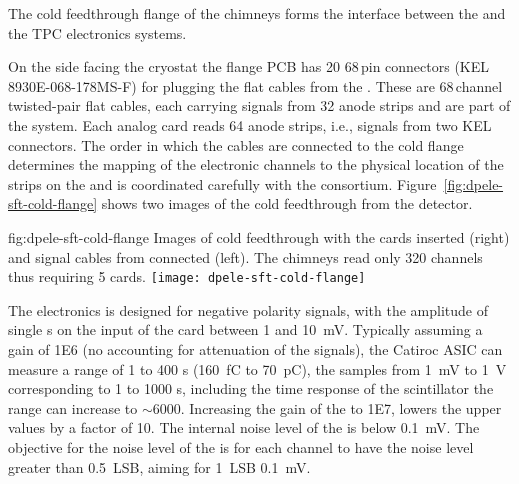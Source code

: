 The cold feedthrough flange of the  chimneys forms the interface between the  and the TPC electronics systems. 

On the side facing the cryostat the flange PCB has \num{20} \num{68}\,pin connectors (KEL 8930E-068-178MS-F) for plugging the flat cables from the . These are \num{68}\,channel twisted-pair flat cables, each carrying signals from \num{32} anode strips and are part of the  system. Each analog  card reads \num{64} anode strips, i.e., %
signals from two KEL connectors. The order in which the cables are connected %
to the cold flange determines the mapping of the electronic channels to the physical location of the strips on the  and is %
coordinated carefully with the  consortium. %
Figure~\ref{fig:dpele-sft-cold-flange} shows two images of the cold feedthrough from the  detector.

\begin{dunefigure}{fig:dpele-sft-cold-flange}
{Images of   cold feedthrough with the  cards inserted (right) and signal cables from  connected (left). The   chimneys read only \num{320} channels thus requiring \num{5}  cards.}
\texttt{[image: dpele-sft-cold-flange]}
\end{dunefigure}

The  electronics is designed for negative polarity  signals, with the amplitude of single \phel{}s on the input of the card between \num{1} and \SI{10}{\milli\volt}. Typically assuming a  gain of \num{1E6} (no accounting for attenuation of the signals), the Catiroc ASIC can measure a range of \num{1} to \num{400} \phel{}s (\SI{160}{\femto\coulomb} to \SI{70}{\pico\coulomb}), the  samples from \SI{1}{\milli\volt} to \SI{1}{\volt} corresponding to \num{1} to \num{1000} \phel{}s, including the time response of the scintillator the range can increase to $\sim$\num{6000}. Increasing the gain of the  to \num{1E7}, lowers the upper values by a factor of 10.
The internal noise level of the  is below \SI{0.1}{\milli\volt}. The objective for the noise level of the  is for each channel to have the \rms noise level greater than \SI{0.5}{LSB}, aiming for \SI{1}{LSB} \SI{0.1}{\milli\volt}.


